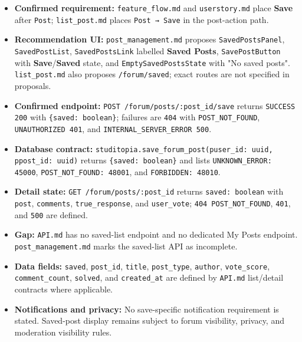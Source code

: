\documentclass[12pt]{article}
\begin{document}
\begin{itemize}
\item \textbf{Confirmed requirement:} \texttt{feature\_flow.md} and \texttt{userstory.md} place \textbf{Save} after \texttt{Post}; \texttt{list\_post.md} places \texttt{Post → Save} in the post-action path.
\item \textbf{Recommendation UI:} \texttt{post\_management.md} proposes \texttt{SavedPostsPanel}, \texttt{SavedPostList}, \texttt{SavedPostsLink} labelled \textbf{Saved Posts}, \texttt{SavePostButton} with \textbf{Save}/\textbf{Saved} state, and \texttt{EmptySavedPostsState} with "No saved posts". \texttt{list\_post.md} also proposes \texttt{/forum/saved}; exact routes are not specified in proposals.
\item \textbf{Confirmed endpoint:} \texttt{POST /forum/posts/:post\_id/save} returns \texttt{SUCCESS 200} with \texttt{\{saved: boolean\}}; failures are \texttt{404} with \texttt{POST\_NOT\_FOUND}, \texttt{UNAUTHORIZED 401}, and \texttt{INTERNAL\_SERVER\_ERROR 500}.
\item \textbf{Database contract:} \texttt{studitopia.save\_forum\_post(puser\_id: uuid, ppost\_id: uuid)} returns \texttt{\{saved: boolean\}} and lists \texttt{UNKNOWN\_ERROR: 45000}, \texttt{POST\_NOT\_FOUND: 48001}, and \texttt{FORBIDDEN: 48010}.
\item \textbf{Detail state:} \texttt{GET /forum/posts/:post\_id} returns \texttt{saved: boolean} with \texttt{post}, \texttt{comments}, \texttt{true\_response}, and \texttt{user\_vote}; \texttt{404 POST\_NOT\_FOUND}, \texttt{401}, and \texttt{500} are defined.
\item \textbf{Gap:} \texttt{API.md} has no saved-list endpoint and no dedicated My Posts endpoint. \texttt{post\_management.md} marks the saved-list API as incomplete.
\item \textbf{Data fields:} \texttt{saved}, \texttt{post\_id}, \texttt{title}, \texttt{post\_type}, \texttt{author}, \texttt{vote\_score}, \texttt{comment\_count}, \texttt{solved}, and \texttt{created\_at} are defined by \texttt{API.md} list/detail contracts where applicable.
\item \textbf{Notifications and privacy:} No save-specific notification requirement is stated. Saved-post display remains subject to forum visibility, privacy, and moderation visibility rules.
\end{itemize}
\par\medskip

\hypertarget{sec:b11-source-alignment-notes}{}
\end{document}
